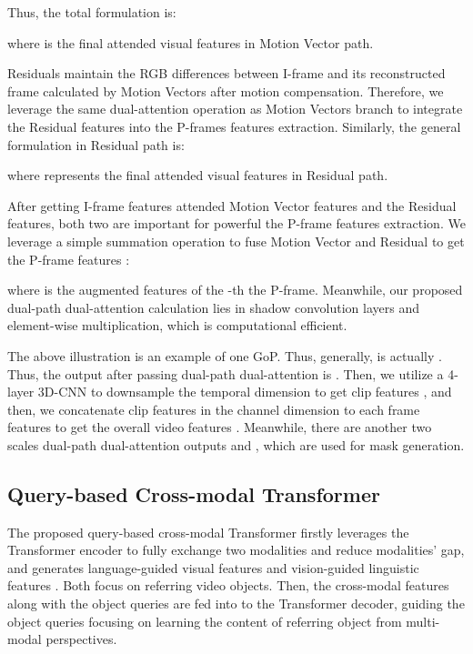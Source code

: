 \documentclass[sigconf]{acmart}
\begin{document}
Thus, the total formulation is:

where  is the final attended visual features in Motion Vector path. 


Residuals maintain the RGB differences between I-frame and its reconstructed frame calculated by Motion Vectors after motion compensation. Therefore, we leverage the same dual-attention operation as Motion Vectors branch to integrate the Residual features into the P-frames features extraction. Similarly, the general formulation in Residual path is:

where  represents the final attended visual features in Residual path.



After getting I-frame features attended Motion Vector features and the Residual features, both two are important for powerful the P-frame features extraction. We leverage a simple summation operation to fuse Motion Vector and Residual to get the P-frame features : 

where  is the augmented features of the -th the P-frame.
Meanwhile, our proposed dual-path dual-attention calculation lies in shadow convolution layers and element-wise multiplication, which is computational efficient.


The above illustration is an example of one GoP. Thus, generally,  is actually . Thus, the output after passing dual-path dual-attention is . Then, we utilize a 4-layer 3D-CNN to downsample the temporal dimension to get clip features , and then, we concatenate clip features in the channel dimension to each frame features to get the overall video features . Meanwhile, there are another two scales dual-path dual-attention outputs  and , which are used for mask generation.

\subsection{Query-based Cross-modal Transformer}


The proposed query-based cross-modal Transformer firstly leverages the Transformer encoder to fully exchange two modalities and reduce modalities’ gap, and generates language-guided visual features  and vision-guided linguistic features . 
Both focus on referring video objects. Then, the cross-modal features along with the object queries are fed into to the Transformer decoder, guiding the object queries focusing on learning the content of referring object from multi-modal perspectives. 
\end{document}
